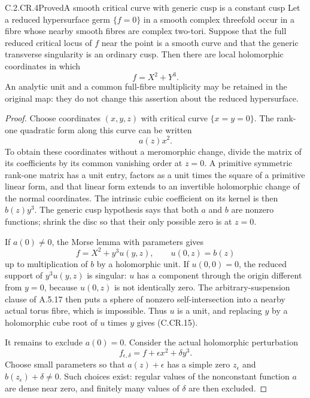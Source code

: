 \begin{statement}{C.2.CR.4}{Proved}{A smooth critical curve with generic cusp is a constant cusp}
Let a reduced hypersurface germ $\{f=0\}$ in a smooth
complex threefold occur in a fibre whose nearby smooth
fibres are complex two-tori. Suppose that the full reduced
critical locus of $f$ near the point is a smooth curve
and that the generic transverse singularity is an ordinary
cusp. Then there are local holomorphic coordinates in which
\[
                            f=X^2+Y^3.             \tag{C.CR.15}
\]
An analytic unit and a common full-fibre multiplicity may
be retained in the original map: they do not change this
assertion about the reduced hypersurface.
\end{statement}
\begin{proof}
Choose coordinates $(x,y,z)$ with critical curve
$\{x=y=0\}$. The rank-one quadratic form along this curve
can be written
\[
 a(z)x^2.
\]
To obtain these coordinates without a meromorphic change,
divide the matrix of its coefficients by its common
vanishing order at $z=0$. A primitive symmetric rank-one
matrix has a unit entry, factors as a unit times the
square of a primitive linear form, and that linear form
extends to an invertible holomorphic change of the normal
coordinates. The intrinsic cubic coefficient on its
kernel is then $b(z)y^3$. The generic cusp hypothesis says
that both $a$ and $b$ are nonzero functions; shrink the
disc so that their only possible zero is at $z=0$.

If $a(0)\ne0$, the Morse lemma with parameters gives
\[
 f=X^2+y^3u(y,z),\qquad u(0,z)=b(z)
\]
up to multiplication of $b$ by a holomorphic unit.
If $u(0,0)=0$, the reduced support of $y^3u(y,z)$ is
singular: $u$ has a component through the origin
different from $y=0$, because $u(0,z)$ is not identically
zero. The arbitrary-suspension clause of A.5.17 then
puts a sphere of nonzero self-intersection into a
nearby actual torus fibre, which is impossible.
Thus $u$ is a unit, and replacing $y$ by a holomorphic
cube root of $u$ times $y$ gives (C.CR.15).

It remains to exclude $a(0)=0$. Consider the actual
holomorphic perturbation
\[
                  f_{\epsilon,\delta}
                      =f+\epsilon x^2+\delta y^3.
 \tag{C.CR.16}
\]
Choose small parameters so that $a(z)+\epsilon$ has a
simple zero $z_\epsilon$ and
$b(z_\epsilon)+\delta\ne0$. Such choices exist:
regular values of the nonconstant function $a$ are
dense near zero, and finitely many values of $\delta$
are then excluded.


\end{proof}
